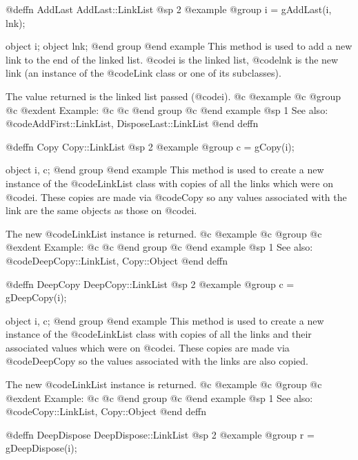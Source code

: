 @deffn {AddLast} AddLast::LinkList
@sp 2
@example
@group
i = gAddLast(i, lnk);

object  i;
object  lnk;
@end group
@end example
This method is used to add a new link to the end of the linked list.
@code{i} is the linked list, @code{lnk} is the new link (an instance of
the @code{Link} class or one of its subclasses).

The value returned is the linked list passed (@code{i}).
@c @example
@c @group
@c @exdent Example:
@c 
@c @end group
@c @end example
@sp 1
See also:  @code{AddFirst::LinkList, DisposeLast::LinkList}
@end deffn






@deffn {Copy} Copy::LinkList
@sp 2
@example
@group
c = gCopy(i);

object  i, c;
@end group
@end example
This method is used to create a new instance of the @code{LinkList} class
with copies of all the links which were on @code{i}.  These copies
are made via @code{Copy} so any values associated with the link are
the same objects as those on @code{i}.

The new @code{LinkList} instance is returned.
@c @example
@c @group
@c @exdent Example:
@c 
@c @end group
@c @end example
@sp 1
See also:  @code{DeepCopy::LinkList, Copy::Object}
@end deffn













@deffn {DeepCopy} DeepCopy::LinkList
@sp 2
@example
@group
c = gDeepCopy(i);

object  i, c;
@end group
@end example
This method is used to create a new instance of the @code{LinkList}
class with copies of all the links and their associated values which
were on @code{i}.  These copies are made via @code{DeepCopy} so
the values associated with the links are also copied.

The new @code{LinkList} instance is returned.
@c @example
@c @group
@c @exdent Example:
@c 
@c @end group
@c @end example
@sp 1
See also:  @code{Copy::LinkList, Copy::Object}
@end deffn













@deffn {DeepDispose} DeepDispose::LinkList
@sp 2
@example
@group
r = gDeepDispose(i);

